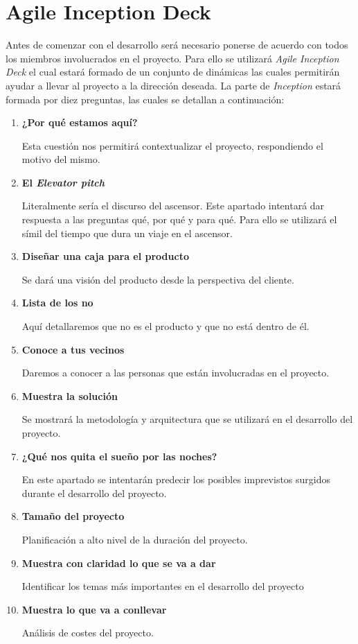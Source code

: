 \section{Agile Inception Deck}

Antes de comenzar con el desarrollo será necesario ponerse de acuerdo con todos los miembros involucrados en el proyecto.
Para ello se utilizará \textit{Agile Inception Deck} \cite{agileInceptionDeck} el cual estará formado de un conjunto de dinámicas las cuales permitirán
ayudar a llevar al proyecto a la dirección deseada. La parte de \textit{Inception} estará formada por diez preguntas, las
cuales se detallan a continuación:

\begin{enumerate}
  \item \textbf{¿Por qué estamos aquí?}

    Esta cuestión nos permitirá contextualizar el proyecto, respondiendo el motivo del mismo.
  \item \textbf{El \textit{Elevator pitch}}

    Literalmente sería el discurso del ascensor. Este apartado intentará dar respuesta a las preguntas qué, por qué y para qué.
    Para ello se utilizará el símil del tiempo que dura un viaje en el ascensor.
  \item \textbf{Diseñar una caja para el producto}

    Se dará una visión del producto desde la perspectiva del cliente.
  \item \textbf{Lista de los no}

    Aquí detallaremos que no es el producto y que no está dentro de él.
  \item \textbf{Conoce a tus vecinos}

    Daremos a conocer a las personas que están involucradas en el proyecto.
  \item \textbf{Muestra la solución}

    Se mostrará la metodología y arquitectura que se utilizará en el desarrollo del proyecto.
  \item \textbf{¿Qué nos quita el sueño por las noches?}

    En este apartado se intentarán predecir los posibles imprevistos surgidos durante
    el desarrollo del proyecto.
  \item \textbf{Tamaño del proyecto}

    Planificación a alto nivel de la duración del proyecto.
  \item \textbf{Muestra con claridad lo que se va a dar}

    Identificar los temas más importantes en el desarrollo del proyecto
  \item \textbf{Muestra lo que va a conllevar}

    Análisis de costes del proyecto.
\end{enumerate}
